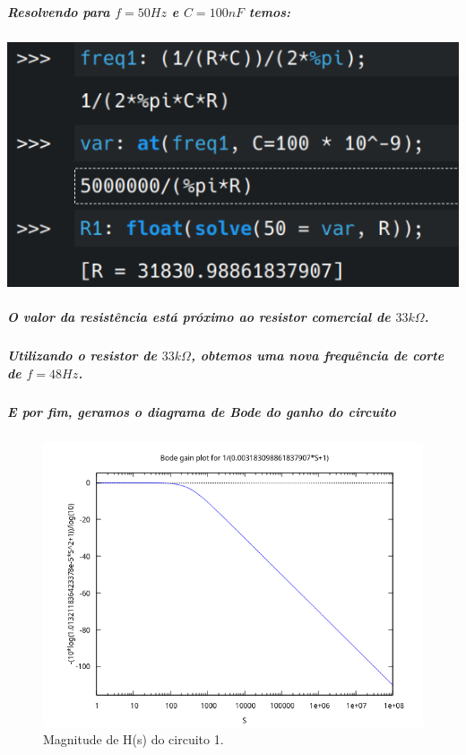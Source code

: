 \documentclass[12pt,twoside, a4paper, twocolumn]{article}
\begin{document}
\subparagraph*{Resolvendo para $f = 50Hz$ e $C = 100nF$ temos:}
\subparagraph*{}
\begin{adjustbox}{scale=0.4}
    \includegraphics{freqcorte1.png}
\end{adjustbox}


\subparagraph*{O valor da resistência está próximo ao resistor comercial de $33k \varOmega$.}


\subparagraph*{Utilizando o resistor de $33k \varOmega$, obtemos uma nova frequência de corte de $f = 48Hz$.}




\subparagraph*{E por fim, geramos o diagrama de Bode do ganho do circuito}


\begin{figure}[h]
    \centering
    \includegraphics[width=1\columnwidth]{images/bodegain1.png}
    \caption{Magnitude de H(s) do circuito 1.}
\end{figure}
\end{document}
